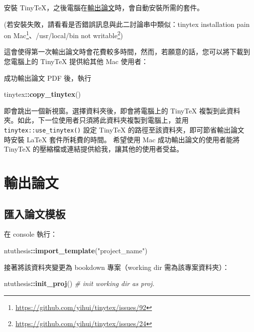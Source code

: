 \documentclass[oneside]{book}
\newenvironment{Shaded}{\begin{snugshade}}{\end{snugshade}}
\newcommand{\CommentTok}[1]{\textcolor[rgb]{0.56,0.35,0.01}{\textit{#1}}}
\newcommand{\KeywordTok}[1]{\textcolor[rgb]{0.13,0.29,0.53}{\textbf{#1}}}
\newcommand{\NormalTok}[1]{#1}
\newcommand{\OperatorTok}[1]{\textcolor[rgb]{0.81,0.36,0.00}{\textbf{#1}}}
\newcommand{\StringTok}[1]{\textcolor[rgb]{0.31,0.60,0.02}{#1}}
\renewcommand{\href}[2]{#2\footnote{\url{#1}}}
\begin{document}
安裝 TinyTeX，之後電腦在\protect\hyperlink{export-thesis}{輸出論文}時，會自動安裝所需的套件。

(若安裝失敗，請看看是否錯誤訊息與此二討論串中類似：\href{https://github.com/yihui/tinytex/issues/92}{tinytex installation pain on Mac}、\href{https://github.com/yihui/tinytex/issues/24}{/usr/local/bin not writable})

這會使得第一次輸出論文時會花費較多時間，然而，若願意的話，您可以將下載到您電腦上的 TinyTeX 提供給其他 Mac 使用者：

成功輸出論文 PDF 後，執行

\begin{Shaded}
\begin{Highlighting}[]
\NormalTok{tinytex}\OperatorTok{::}\KeywordTok{copy_tinytex}\NormalTok{()}
\end{Highlighting}
\end{Shaded}

即會跳出一個新視窗。選擇資料夾後，即會將電腦上的 TinyTeX 複製到此資料夾。如此，下一位使用者只須將此資料夾複製到電腦上，並用 \texttt{tinytex::use\_tinytex()} 設定 TinyTeX 的路徑至該資料夾，即可節省輸出論文時安裝 LaTeX 套件所耗費的時間。
希望使用 Mac 成功輸出論文的使用者能將 TinyTeX 的壓縮檔或連結提供給我，讓其他的使用者受益。

\hypertarget{export-thesis}{%
\chapter{輸出論文}\label{export-thesis}}

\hypertarget{import-template}{%
\section{匯入論文模板}\label{import-template}}

在 console 執行：

\begin{Shaded}
\begin{Highlighting}[]
\NormalTok{ntuthesis}\OperatorTok{::}\KeywordTok{import_template}\NormalTok{(}\StringTok{"project_name"}\NormalTok{)}
\end{Highlighting}
\end{Shaded}

接著將該資料夾變更為 bookdown 專案（working dir 需為該專案資料夾）：

\begin{Shaded}
\begin{Highlighting}[]
\NormalTok{ntuthesis}\OperatorTok{::}\KeywordTok{init_proj}\NormalTok{()  }\CommentTok{# init working dir as proj.}
\end{Highlighting}
\end{Shaded}
\end{document}
